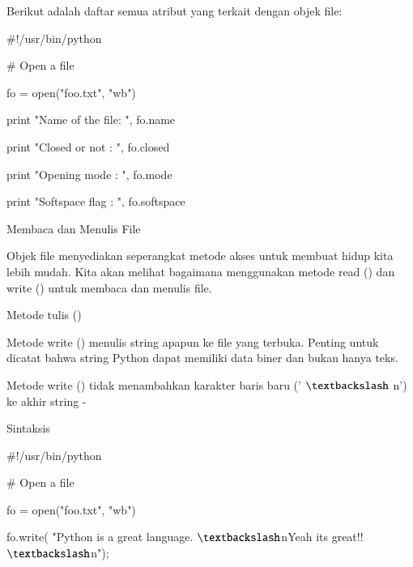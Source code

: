 \documentclass[a4paper,12pt]{report}
\begin{document}
\vspace{12pt}
\noindent 
Berikut adalah daftar semua atribut yang terkait dengan objek file: \par
\vspace{16pt}
\vspace{16pt}
\vspace{16pt}
\noindent 
 $  \#  $!/usr/bin/python \par
\vspace{12pt}
\noindent 
 $  \#  $ Open a file \par
\noindent 
fo = open("foo.txt", "wb") \par
\noindent 
print "Name of the file: ", fo.name \par
\noindent 
print "Closed or not : ", fo.closed \par
\noindent 
print "Opening mode : ", fo.mode \par
\noindent 
print "Softspace flag : ", fo.softspace \par
\vspace{12pt}
\noindent 
Membaca dan Menulis File \par
\vspace{12pt}
\noindent 
Objek file menyediakan seperangkat metode akses untuk membuat hidup kita lebih mudah. Kita akan melihat bagaimana menggunakan metode read () dan write () untuk membaca dan menulis file. \par
\noindent 
Metode tulis () \par
\vspace{12pt}
\noindent 
Metode write () menulis string apapun ke file yang terbuka. Penting untuk dicatat bahwa string Python dapat memiliki data biner dan bukan hanya teks. \par
\vspace{12pt}
\noindent 
Metode write () tidak menambahkan karakter baris baru (' $  \textbackslash  $ n') ke akhir string - \par
\noindent 
Sintaksis \par
\vspace{12pt}
\noindent 
 $  \#  $!/usr/bin/python \par
\vspace{12pt}
\noindent 
 $  \#  $ Open a file \par
\noindent 
fo = open("foo.txt", "wb") \par
\noindent 
fo.write( "Python is a great language. $  \textbackslash  $nYeah its great!! $  \textbackslash  $n"); \par
\vspace{12pt}
\end{document}
